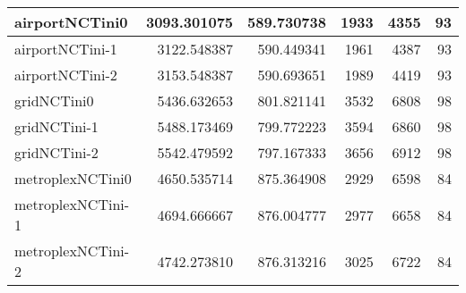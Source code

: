 \begin{longtable}{|l|r|r|r|r|r|}
airportNCTini0 & 3093.301075 & 589.730738 & 1933 & 4355 & 93 \\ \hline
airportNCTini-1 & 3122.548387 & 590.449341 & 1961 & 4387 & 93 \\ \hline
airportNCTini-2 & 3153.548387 & 590.693651 & 1989 & 4419 & 93 \\ \hline
gridNCTini0 & 5436.632653 & 801.821141 & 3532 & 6808 & 98 \\ \hline
gridNCTini-1 & 5488.173469 & 799.772223 & 3594 & 6860 & 98 \\ \hline
gridNCTini-2 & 5542.479592 & 797.167333 & 3656 & 6912 & 98 \\ \hline
metroplexNCTini0 & 4650.535714 & 875.364908 & 2929 & 6598 & 84 \\ \hline
metroplexNCTini-1 & 4694.666667 & 876.004777 & 2977 & 6658 & 84 \\ \hline
metroplexNCTini-2 & 4742.273810 & 876.313216 & 3025 & 6722 & 84 \\ \hline
\end{longtable}
